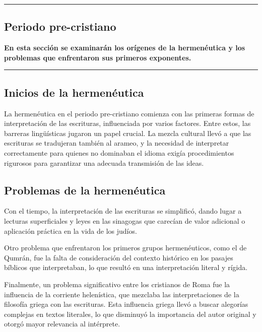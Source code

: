 {\color{gray}\hrule}
\begin{center}


\section{Periodo pre-cristiano}
\textbf{En esta sección se examinarán los orígenes de la hermenéutica y los problemas que enfrentaron sus primeros exponentes.}
\end{center}

{\color{gray}\hrule}
\begin{multicols}{2}

\subsection{Inicios de la hermenéutica}

La hermenéutica en el periodo pre-cristiano comienza con las primeras formas de interpretación de las escrituras, influenciada por varios factores. Entre estos, las barreras lingüísticas jugaron un papel crucial. La mezcla cultural llevó a que las escrituras se tradujeran también al arameo, y la necesidad de interpretar correctamente para quienes no dominaban el idioma exigía procedimientos rigurosos para garantizar una adecuada transmisión de las ideas.

\subsection{Problemas de la hermenéutica}

Con el tiempo, la interpretación de las escrituras se simplificó, dando lugar a lecturas superficiales y leyes en las sinagogas que carecían de valor adicional o aplicación práctica en la vida de los judíos.

Otro problema que enfrentaron los primeros grupos hermenéuticos, como el de Qumrán, fue la falta de consideración del contexto histórico en los pasajes bíblicos que interpretaban, lo que resultó en una interpretación literal y rígida.

Finalmente, un problema significativo entre los cristianos de Roma fue la influencia de la corriente helenística, que mezclaba las interpretaciones de la filosofía griega con las escrituras. Esta influencia griega llevó a buscar alegorías complejas en textos literales, lo que disminuyó la importancia del autor original y otorgó mayor relevancia al intérprete.

\end{multicols}
